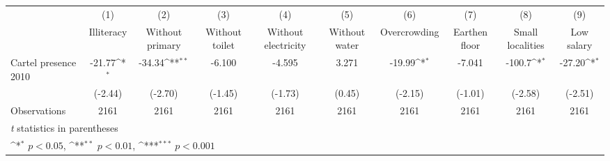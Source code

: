 {
\def\sym#1{\ifmmode^{#1}\else\(^{#1}\)\fi}
\begin{tabular}{l*{9}{c}}
\hline\hline
                    &\multicolumn{1}{c}{(1)}&\multicolumn{1}{c}{(2)}&\multicolumn{1}{c}{(3)}&\multicolumn{1}{c}{(4)}&\multicolumn{1}{c}{(5)}&\multicolumn{1}{c}{(6)}&\multicolumn{1}{c}{(7)}&\multicolumn{1}{c}{(8)}&\multicolumn{1}{c}{(9)}\\
                    &\multicolumn{1}{c}{Illiteracy}&\multicolumn{1}{c}{Without primary}&\multicolumn{1}{c}{Without toilet}&\multicolumn{1}{c}{Without electricity}&\multicolumn{1}{c}{Without water}&\multicolumn{1}{c}{Overcrowding}&\multicolumn{1}{c}{Earthen floor}&\multicolumn{1}{c}{Small localities}&\multicolumn{1}{c}{Low salary}\\
\hline
Cartel presence 2010&      -21.77\sym{*}  &      -34.34\sym{**} &      -6.100         &      -4.595         &       3.271         &      -19.99\sym{*}  &      -7.041         &      -100.7\sym{*}  &      -27.20\sym{*}  \\
                    &     (-2.44)         &     (-2.70)         &     (-1.45)         &     (-1.73)         &      (0.45)         &     (-2.15)         &     (-1.01)         &     (-2.58)         &     (-2.51)         \\
\hline
Observations        &        2161         &        2161         &        2161         &        2161         &        2161         &        2161         &        2161         &        2161         &        2161         \\
\hline\hline
\multicolumn{10}{l}{\footnotesize \textit{t} statistics in parentheses}\\
\multicolumn{10}{l}{\footnotesize \sym{*} \(p<0.05\), \sym{**} \(p<0.01\), \sym{***} \(p<0.001\)}\\
\end{tabular}
}
